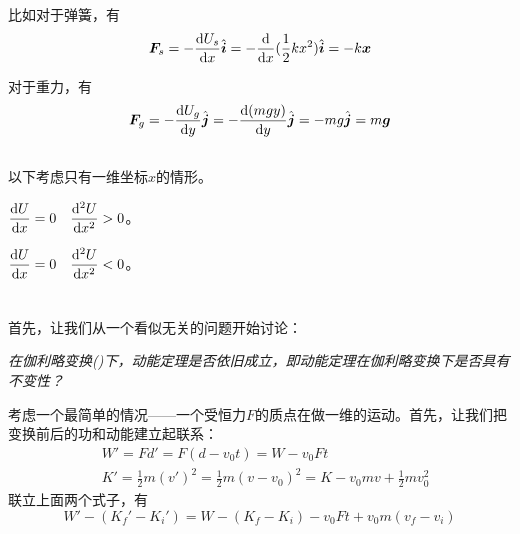 比如对于弹簧，有
\[\vec{F}_{s}=-\frac{\dif U_{s}}{\dif x}\hat{\vec{i}}=-\frac{\dif }{\dif x}(\frac{1}{2}kx^{2})\hat{\vec{i}}=-k\vec{x}\]

对于重力，有
\[\vec{F}_{g}=-\frac{\dif U_{g}}{\dif y}\hat{\vec{j}}=-\frac{\dif (mgy)}{\dif y}\hat{\vec{j}}=-mg\hat{\vec{j}}=m\vec{g}\]

\subsection[系统的平衡性]{}
以下考虑只有一维坐标$x$的情形。
\begin{Itemize}
 \item {}$\dfrac{\dif U}{\dif x}=0\quad\dfrac{\dif ^2U}{\dif x^{2} }>0$。
 \item {}$\dfrac{\dif U}{\dif x}=0\quad\dfrac{\dif ^2U}{\dif x^{2} }<0$。
\end{Itemize}
\section[动量守恒]{}

\subsection[动量定理]{}
首先，让我们从一个看似无关的问题开始讨论：

\emph{在伽利略变换()下，动能定理是否依旧成立，即动能定理在伽利略变换下是否具有不变性？}

考虑一个最简单的情况——一个受恒力$F$的质点在做一维的运动。首先，让我们把变换前后的功和动能建立起联系：
\begin{equation}
  \begin{aligned}
     &W'=Fd'=F(d-v_{0}t)=W-v_{0}Ft\\
     &K'=\frac{1}{2}m(v')^{2}=\frac{1}{2}m(v-v_{0})^{2}=K-v_{0}mv+\frac{1}{2}mv_{0}^{2}
  \end{aligned}
  \nonumber
\end{equation}
联立上面两个式子，有
\[W'-(K_{f}'-K_{i}')=W-(K_{f}-K_{i})-v_{0}Ft+v_{0}m(v_{f}-v_{i})\]


